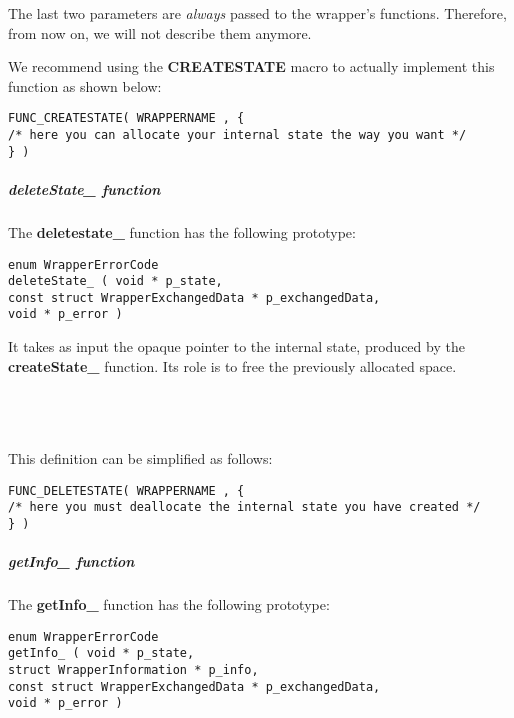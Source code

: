The last two parameters are \emph{always} passed to the wrapper's functions. Therefore, from now on, we will not describe them anymore.

We recommend using the {\bf CREATESTATE} macro to actually implement this function as shown below:
\lstset{language=C++, basicstyle=\normalsize}
\begin{lstlisting}[frame=TBRL]
FUNC_CREATESTATE( WRAPPERNAME , {
/* here you can allocate your internal state the way you want */
} )
\end{lstlisting}

\subparagraph{deleteState\_ function}

The {\bf deletestate\_} function has the following prototype:

\lstset{language=C++, basicstyle=\normalsize}
\begin{lstlisting}[frame=TBRL]
enum WrapperErrorCode
deleteState_ ( void * p_state,
const struct WrapperExchangedData * p_exchangedData,
void * p_error )
\end{lstlisting}

It takes  as input the opaque pointer to the internal state, produced by the {\bf createState\_} function. Its role is to free the previously allocated space.

\ \\
\ \\
\ \\

This definition can be simplified as follows:
\lstset{language=C++, basicstyle=\normalsize}
\begin{lstlisting}[frame=TBRL]
FUNC_DELETESTATE( WRAPPERNAME , {
/* here you must deallocate the internal state you have created */
} )
\end{lstlisting}

\subparagraph{getInfo\_ function}

The {\bf getInfo\_} function has the following prototype:

\lstset{language=C++, basicstyle=\normalsize}
\begin{lstlisting}[frame=TBRL]
enum WrapperErrorCode
getInfo_ ( void * p_state,
struct WrapperInformation * p_info,
const struct WrapperExchangedData * p_exchangedData,
void * p_error )
\end{lstlisting}

